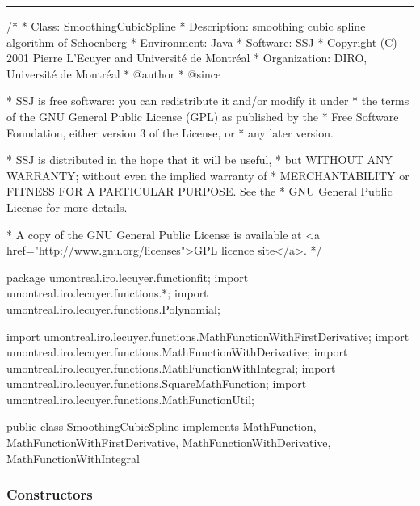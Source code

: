 \bigskip\hrule

\begin{code}
\begin{hide}
/*
 * Class:        SmoothingCubicSpline
 * Description:  smoothing cubic spline algorithm of Schoenberg
 * Environment:  Java
 * Software:     SSJ 
 * Copyright (C) 2001  Pierre L'Ecuyer and Université de Montréal
 * Organization: DIRO, Université de Montréal
 * @author       
 * @since

 * SSJ is free software: you can redistribute it and/or modify it under
 * the terms of the GNU General Public License (GPL) as published by the
 * Free Software Foundation, either version 3 of the License, or
 * any later version.

 * SSJ is distributed in the hope that it will be useful,
 * but WITHOUT ANY WARRANTY; without even the implied warranty of
 * MERCHANTABILITY or FITNESS FOR A PARTICULAR PURPOSE.  See the
 * GNU General Public License for more details.

 * A copy of the GNU General Public License is available at
   <a href="http://www.gnu.org/licenses">GPL licence site</a>.
 */
\end{hide}
package umontreal.iro.lecuyer.functionfit;
   import umontreal.iro.lecuyer.functions.*;
   import umontreal.iro.lecuyer.functions.Polynomial;\begin{hide}
import umontreal.iro.lecuyer.functions.MathFunctionWithFirstDerivative;
import umontreal.iro.lecuyer.functions.MathFunctionWithDerivative;
import umontreal.iro.lecuyer.functions.MathFunctionWithIntegral;
import umontreal.iro.lecuyer.functions.SquareMathFunction;
import umontreal.iro.lecuyer.functions.MathFunctionUtil;
\end{hide}

public class SmoothingCubicSpline implements MathFunction,
             MathFunctionWithFirstDerivative, MathFunctionWithDerivative,
             MathFunctionWithIntegral\begin{hide} {

   private Polynomial[] splineVector;
   private double[] x, y, weight;
   private double rho;
\end{hide}
\end{code}
\subsubsection* {Constructors}


